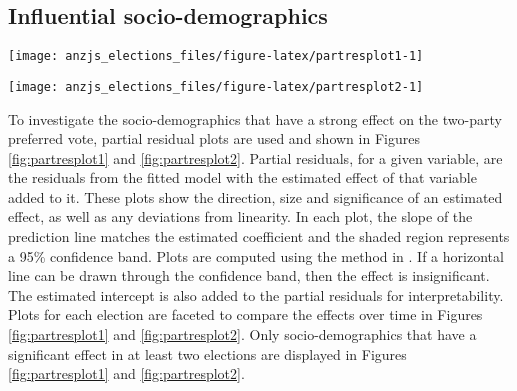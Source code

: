 \documentclass[times, doublespace]{anzsauth}
\let\origfigure\figure
\let\endorigfigure\endfigure
\renewenvironment{figure}[1][2] {
    \expandafter\origfigure\expandafter[htbp]
} {
    \endorigfigure
}
\begin{document}
\hypertarget{influential-socio-demographics}{%
\subsection{Influential socio-demographics}\label{influential-socio-demographics}}



\begin{figure}[h]

{\centering \texttt{[image: anzjs\_elections\_files/figure-latex/partresplot1-1]} 

}

\caption{Partial residual plots by election year for a selection of predictors. Linear model with 95\% confidence bands overlaid. Most predictors have a positive relationship: the larger the value the more likely the electorate preferences the Coalition. The relationship is relatively robust over time, with the exception of \texttt{Incomes}, \texttt{OtherLanguageHome}, \texttt{Pop\_00\_19} and \texttt{DiffAddress}.}\label{fig:partresplot1}
\end{figure}



\begin{figure}[h]

{\centering \texttt{[image: anzjs\_elections\_files/figure-latex/partresplot2-1]} 

}

\caption{Partial residual plots by election year for a selection of predictors. Linear model with 95\% confidence bands overlaid. Several predictors have a negative relationship: with larger values indicating the electorate more likely preferences Labor. Most relationships are relatively stable over elections, except \texttt{Unemployment} and \texttt{Education}."}\label{fig:partresplot2}
\end{figure}

To investigate the socio-demographics that have a strong effect on the two-party preferred vote, partial residual plots are used and shown in Figures \ref{fig:partresplot1} and \ref{fig:partresplot2}. Partial residuals, for a given variable, are the residuals from the fitted model with the estimated effect of that variable added to it. These plots show the direction, size and significance of an estimated effect, as well as any deviations from linearity. In each plot, the slope of the prediction line matches the estimated coefficient and the shaded region represents a 95\% confidence band. Plots are computed using the method in \citet{visreg}. If a horizontal line can be drawn through the confidence band, then the effect is insignificant. The estimated intercept is also added to the partial residuals for interpretability. Plots for each election are faceted to compare the effects over time in Figures \ref{fig:partresplot1} and \ref{fig:partresplot2}. Only socio-demographics that have a significant effect in at least two elections are displayed in Figures \ref{fig:partresplot1} and \ref{fig:partresplot2}.
\end{document}
